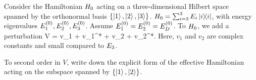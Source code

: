 \newcommand{\kq}{\ket{1}}
\newcommand{\kw}{\ket{2}}
\newcommand{\ke}{\ket{3}}

\newcommand{\vq}{v_1}
\newcommand{\vw}{v_2}
\newcommand{\ve}{v_3}

\newcommand{\vqs}{\vq^*}
\newcommand{\vws}{\vw^*}

\newcommand{\Heff}{H_\text{eff}}
\newcommand{\Eo}{E\suo}
\newcommand{\Eod}{\Eo_D}

\newcommand{\Pq}{P_1}

\begin{statement}{}
	Consider the Hamiltonian $H_0$ acting on a three-dimensional Hilbert space spanned by the orthonormal basis $\{\kq, \kw, \ke\}$.  $H_0 = \sum_{i = 3}^3 E_i \ketbra{i}$, with energy eigenvalues $E^{(0)}_1, E^{(0)}_2, E^{(0)}_3$.  Assume $\Eoq = \Eow = \Eod$.  To $H_0$, we add a perturbation
	\beq
		V = \vq {} + \vqs {} + \vw {} + \vws {}.
	\eeq
	Here, $\vq$ and $\vw$ are complex constants and small compared to $E_3$.
\end{statement}

\begin{problem}
	To second order in $V$, write down the explicit form of the effective Hamiltonian acting on the subspace spanned by $\{\kq, \kw\}$.
\end{problem}

